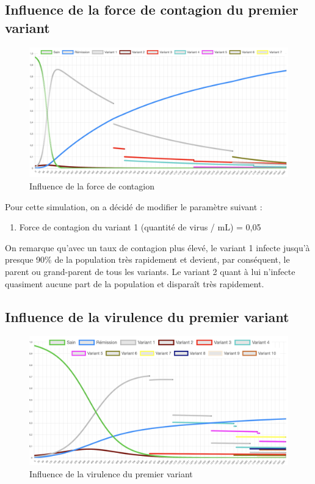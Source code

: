 \documentclass{article}
\begin{document}
\subsection{Influence de la force de contagion du premier variant}

\begin{figure}[h]
    \includegraphics[width=\linewidth]{images/Simulation3.png}
    \caption{Influence de la force de contagion}
    \label{fig:simulation3}
\end{figure}

Pour cette simulation, on a décidé de modifier le paramètre suivant :
\begin{enumerate}
    \item Force de contagion du variant 1 (quantité de virus / mL) = 0,05 \\
\end{enumerate}

\noindent
On remarque qu'avec un taux de contagion plus élevé, le variant 1 infecte jusqu'à presque 90\% de la population très rapidement et devient, par conséquent, le parent ou grand-parent de tous les variants. Le variant 2 quant à lui n'infecte quasiment aucune part de la population et disparaît très rapidement. \\

\subsection{Influence de la virulence du premier variant}

\begin{figure}[h]
    \includegraphics[width=\linewidth]{images/Simulation4.png}
    \caption{Influence de la virulence du premier variant}
    \label{fig:simulation4}
\end{figure}
\end{document}
